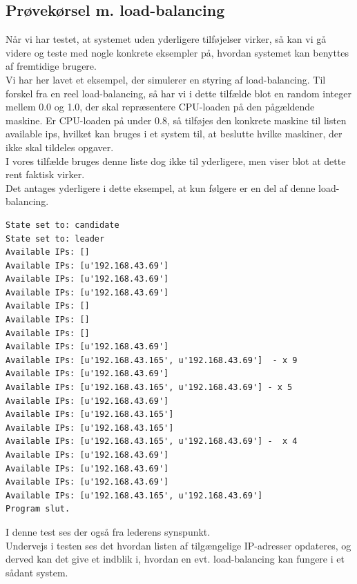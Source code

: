 \documentclass[a4paper,12pt]{article}
\begin{document}
\subsection{Prøvekørsel m. load-balancing}
Når vi har testet, at systemet uden yderligere tilføjelser virker, så kan vi gå videre og teste med nogle konkrete eksempler på, hvordan systemet kan benyttes af fremtidige brugere.
\\
Vi har her lavet et eksempel, der simulerer en styring af load-balancing. 
Til forskel fra en reel load-balancing, så har vi i dette tilfælde blot en random integer mellem 0.0 og 1.0, der skal repræsentere CPU-loaden på den pågældende maskine.
Er CPU-loaden på under 0.8, så tilføjes den konkrete maskine til listen available ips, hvilket kan bruges i et system til, at beslutte hvilke maskiner, der ikke skal tildeles opgaver.
\\
I vores tilfælde bruges denne liste dog ikke til yderligere, men viser blot at dette rent faktisk virker.
\\
Det antages yderligere i dette eksempel, at kun følgere er en del af denne load-balancing.
\begin{lstlisting}
State set to: candidate
State set to: leader
Available IPs: []
Available IPs: [u'192.168.43.69']
Available IPs: [u'192.168.43.69']
Available IPs: [u'192.168.43.69']
Available IPs: []
Available IPs: []
Available IPs: []
Available IPs: [u'192.168.43.69']
Available IPs: [u'192.168.43.165', u'192.168.43.69']  - x 9
Available IPs: [u'192.168.43.69']
Available IPs: [u'192.168.43.165', u'192.168.43.69'] - x 5
Available IPs: [u'192.168.43.69']
Available IPs: [u'192.168.43.165']
Available IPs: [u'192.168.43.165']
Available IPs: [u'192.168.43.165', u'192.168.43.69'] -  x 4
Available IPs: [u'192.168.43.69']
Available IPs: [u'192.168.43.69']
Available IPs: [u'192.168.43.69']
Available IPs: [u'192.168.43.165', u'192.168.43.69']
Program slut.
\end{lstlisting}
I denne test ses der også fra lederens synspunkt.
\\
Undervejs i testen ses det hvordan listen af tilgængelige IP-adresser opdateres, og derved kan det give et indblik i, hvordan en evt. load-balancing kan fungere i et sådant system.
\end{document}
